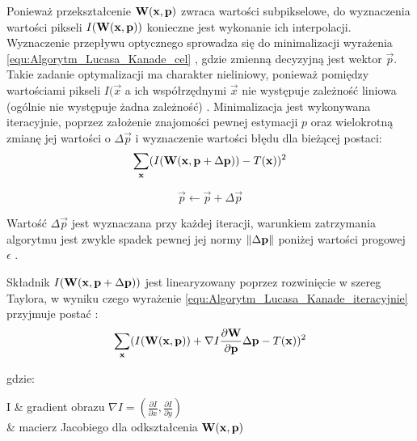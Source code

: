 Ponieważ przekształcenie $\mathbf{W}(\mathbf{x}, \mathbf{p})$ zwraca wartości subpikselowe, do wyznaczenia wartości pikseli $I(\mathbf{W}(\mathbf{x}, \mathbf{p}))$ konieczne jest wykonanie ich interpolacji. Wyznaczenie przepływu optycznego sprowadza się do minimalizacji wyrażenia \ref{equ:Algorytm_Lucasa_Kanade_cel} , gdzie zmienną decyzyjną jest wektor $\vec{p}$. Takie zadanie optymalizacji ma charakter nieliniowy, ponieważ pomiędzy wartościami pikseli $I(\vec{x}$ a ich współrzędnymi $\vec{x}$ nie występuje zależność liniowa (ogólnie nie występuje żadna zależność) \cite{Baker2004}. Minimalizacja jest wykonywana iteracyjnie, poprzez założenie znajomości pewnej estymacji $p$ oraz wielokrotną zmianę jej wartości o $\Delta \vec{p}$ i wyznaczenie wartości błędu dla bieżącej postaci:
\begin{equation}
\label{equ:Algorytm_Lucasa_Kanade_iteracyjnie}
	\sum\limits_{\mathbf{x}} (I(\mathbf{W}(\mathbf{x}, \mathbf{p} + \Delta \mathbf{p})) - T(\mathbf{x}))^2
\end{equation}

\begin{equation}
\label{equ:Algorytm_Lucasa_Kanade_podstawienie}
	\vec{p} \gets \vec{p} + \Delta \vec{p}
\end{equation}

Wartość $\Delta \vec{p}$ jest wyznaczana przy każdej iteracji, warunkiem zatrzymania algorytmu jest zwykle spadek pewnej jej normy $\lVert\Delta \mathbf{p}\rVert$ poniżej wartości progowej $\epsilon$ \cite{Baker2004}. 

Składnik $I(\mathbf{W}(\mathbf{x}, \mathbf{p} + \Delta \mathbf{p}))$ jest linearyzowany poprzez rozwinięcie w szereg Taylora, w wyniku czego wyrażenie \ref{equ:Algorytm_Lucasa_Kanade_iteracyjnie} przyjmuje postać \cite{Baker2004}:
\begin{equation}
\label{equ:Algorytm_Lucasa_Kanade_Taylor}
	\sum\limits_{\mathbf{x}} (I(\mathbf{W}(\mathbf{x}, \mathbf{p})) + \nabla I \frac{\partial \mathbf{W}}{\partial \mathbf{p}} \Delta \mathbf{p} - T(\mathbf{x}))^2
\end{equation}

\noindent
gdzie:

\begin{conditions}
	\nabla I & gradient obrazu $\nabla I = (\frac{\partial I}{\partial x}, \frac{\partial I}{\partial y})$ \\
	 & macierz Jacobiego dla odkształcenia $\mathbf{W}(\mathbf{x}, \mathbf{p})$ \\
\end{conditions}

